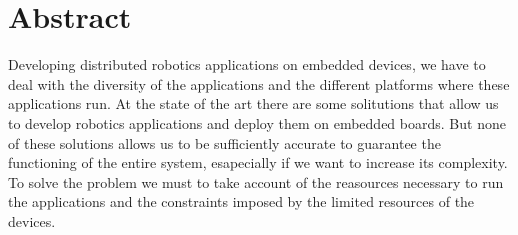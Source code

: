 \chapter{Abstract}
Developing distributed robotics applications on embedded devices, we have to deal with the diversity of the applications and the different platforms where these applications run.
At the state of  the art there are some solitutions that allow us to develop robotics applications and deploy them on embedded boards. 
But none of these solutions allows us to be sufficiently accurate to guarantee the functioning of the entire system, esapecially if we want to increase its complexity.
To solve the problem we must to take account of the reasources necessary to run the applications and the constraints imposed by the limited resources of the devices.








\clearpage
\thispagestyle{empty}
